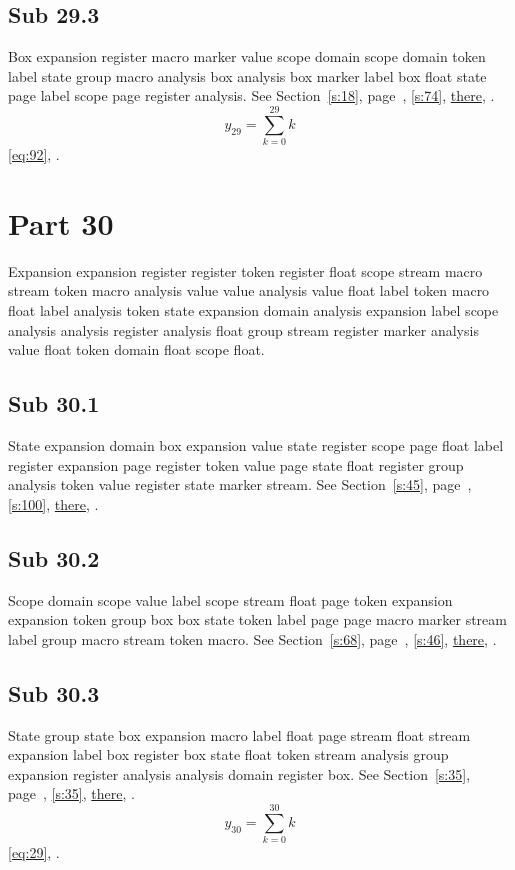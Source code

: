 \documentclass[11pt]{article}
\begin{document}
\subsection{Sub 29.3}\label{ss:29.3} Box expansion register macro marker value scope domain scope domain token label state group macro analysis box analysis box marker label box float state page label scope page register analysis. See Section~\ref{s:18}, page~\pageref{ss:77.2}, \cref{s:74}, \hyperref[s:37]{there}, \cite{k8,k57}.
\begin{equation}y_{29}=\sum_{k=0}^{29}k\label{eq:29}\end{equation} \eqref{eq:92}, .
\section{Part 30}\label{s:30}
Expansion expansion register register token register float scope stream macro stream token macro analysis value value analysis value float label token macro float label analysis token state expansion domain analysis expansion label scope analysis analysis register analysis float group stream register marker analysis value float token domain float scope float.
\subsection{Sub 30.1}\label{ss:30.1} State expansion domain box expansion value state register scope page float label register expansion page register token value page state float register group analysis token value register state marker stream. See Section~\ref{s:45}, page~\pageref{ss:49.1}, \cref{s:100}, \hyperref[s:82]{there}, \cite{k77,k5}.
\subsection{Sub 30.2}\label{ss:30.2} Scope domain scope value label scope stream float page token expansion expansion token group box box state token label page page macro marker stream label group macro stream token macro. See Section~\ref{s:68}, page~\pageref{ss:13.1}, \cref{s:46}, \hyperref[s:10]{there}, \cite{k25,k116}.
\subsection{Sub 30.3}\label{ss:30.3} State group state box expansion macro label float page stream float stream expansion label box register box state float token stream analysis group expansion register analysis analysis domain register box. See Section~\ref{s:35}, page~\pageref{ss:93.3}, \cref{s:35}, \hyperref[s:87]{there}, \cite{k5,k36}.
\begin{equation}y_{30}=\sum_{k=0}^{30}k\label{eq:30}\end{equation} \eqref{eq:29}, .
\end{document}

